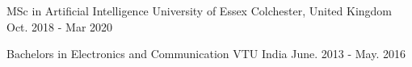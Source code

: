 
\begin{cventries}

 \cventry
  {MSc in Artificial Intelligence}
  {University of Essex}
  {Colchester, United Kingdom}
  {Oct. 2018 - Mar 2020}
  {}

 \cventry
  {Bachelors in Electronics and Communication}
  {VTU}
  {India}
  {June. 2013 - May. 2016}
  {}


  {}
\end{cventries}
